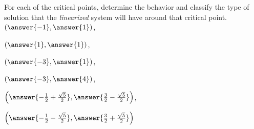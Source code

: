 \documentclass{ximera}
\begin{document}
\begin{exercise}
\begin{problem}
        \begin{problem}
            For each of the critical points, determine the behavior and classify the type of solution that the  \emph{linearized} system will have around that critical point. \\
            $\left(\answer{-1}, \answer{1}\right)$,   \\
            \begin{multipleChoice}
            \end{multipleChoice}
            $\left(\answer{1}, \answer{1}\right)$, 
            \begin{multipleChoice}
            \end{multipleChoice}
            $\left(\answer{-3}, \answer{1}\right)$, 
            \begin{multipleChoice}
            \end{multipleChoice}
            $\left(\answer{-3}, \answer{4}\right)$, 
            \begin{multipleChoice}
            \end{multipleChoice}
            $\left( \answer{-\frac{1}{2} + \frac{\sqrt{5}}{2}}, \answer{\frac{3}{2} - \frac{\sqrt{5}}{2}}\right)$, 
            \begin{multipleChoice}
            \end{multipleChoice}
            $\left( \answer{-\frac{1}{2} - \frac{\sqrt{5}}{2}}, \answer{\frac{3}{2} + \frac{\sqrt{5}}{2}}\right)$ 
            \begin{multipleChoice}
            \end{multipleChoice}
        \end{problem}
    \end{problem}
\end{exercise}
\end{document}
